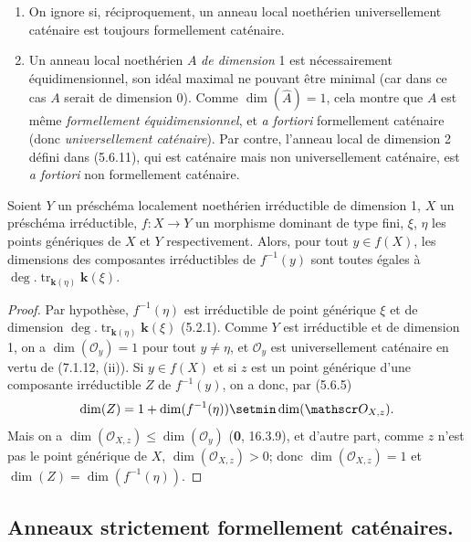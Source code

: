 \begin{remarks}[7.1.12]
\label{IV.2.s7.1.12-fr}
\begin{enumerate}
\item[(i)] On ignore si, réciproquement, un anneau local noethérien
universellement caténaire est toujours formellement caténaire.
\item[(ii)] Un anneau local noethérien $A$ \emph{de dimension} 1 est nécessairement
équidimensionnel, son idéal maximal ne pouvant être minimal (car dans ce
cas $A$ serait de dimension 0). Comme $\dim(\widehat A)=1$, cela montre que
$A$ est même \emph{formellement équidimensionnel}, et \emph{a fortiori}
formellement caténaire (donc \emph{universellement caténaire}). Par contre,
l'anneau local de dimension 2 défini dans (5.6.11), qui est caténaire mais
non universellement caténaire, est \emph{a fortiori} non formellement
caténaire.
\end{enumerate}
\end{remarks}

\begin{corollary}[7.1.13]
\label{IV.2.s7.1.13-fr}
Soient $Y$ un préschéma localement noethérien irréductible de dimension \textup{1},
$X$ un préschéma irréductible, $f:X\to Y$ un morphisme dominant de type
fini, $\xi$, $\eta$ les points génériques de $X$ et $Y$ respectivement.
Alors, pour tout $y\in f(X)$, les dimensions des composantes irréductibles
de $f^{-1}(y)$ sont toutes égales à
$\deg.\operatorname{tr}_{\mathbf{k}(\eta)}\boldsymbol{k}(\xi)$.
\end{corollary}

\begin{proof}
Par hypothèse, $f^{-1}(\eta)$ est irréductible de point générique $\xi$ et
de dimension $\deg.\operatorname{tr}_{\mathbf{k}(\eta)}\boldsymbol{k}(\xi)$ (5.2.1). Comme $Y$
est irréductible et de dimension 1, on a $\dim(\mathscr O_y)=1$ pour tout
$y\neq\eta$, et $\mathscr O_y$ est universellement caténaire en vertu de
(7.1.12, (ii)). Si $y\in f(X)$ et si $z$ est un point générique d'une
composante irréductible $Z$ de $f^{-1}(y)$, on a donc, par (5.6.5)
\[
\dim(Z)=1+\dim(f^{-1}(\eta))\setmin\dim(\mathscr O_{X,z}).
\]
Mais on a $\dim(\mathscr O_{X,z})\leqslant\dim(\mathscr O_y)$ (\textbf{0},
16.3.9), et d'autre part, comme $z$ n'est pas le point générique de $X$,
$\dim(\mathscr O_{X,z})>0$; donc $\dim(\mathscr O_{X,z})=1$ et
$\dim(Z)=\dim(f^{-1}(\eta))$.
\end{proof}

\subsection{Anneaux strictement formellement caténaires.}
\label{subsection:IV.7.2-fr}

